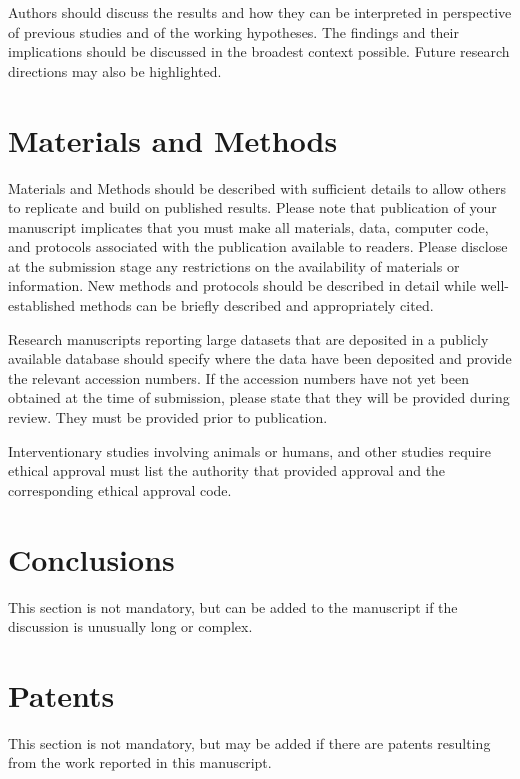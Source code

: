 \documentclass[entropy,article,submit,moreauthors,pdftex,10pt,a4paper]{Definitions/mdpi}
\begin{document}
Authors should discuss the results and how they can be interpreted in perspective of previous studies and of the working hypotheses. The findings and their implications should be discussed in the broadest context possible. Future research directions may also be highlighted.

\section{Materials and Methods}

Materials and Methods should be described with sufficient details to allow others to replicate and build on published results. Please note that publication of your manuscript implicates that you must make all materials, data, computer code, and protocols associated with the publication available to readers. Please disclose at the submission stage any restrictions on the availability of materials or information. New methods and protocols should be described in detail while well-established methods can be briefly described and appropriately cited.

Research manuscripts reporting large datasets that are deposited in a publicly available database should specify where the data have been deposited and provide the relevant accession numbers. If the accession numbers have not yet been obtained at the time of submission, please state that they will be provided during review. They must be provided prior to publication.

Interventionary studies involving animals or humans, and other studies require ethical approval must list the authority that provided approval and the corresponding ethical approval code. 

\section{Conclusions}

This section is not mandatory, but can be added to the manuscript if the discussion is unusually long or complex.

\section{Patents}
This section is not mandatory, but may be added if there are patents resulting from the work reported in this manuscript.
\end{document}
